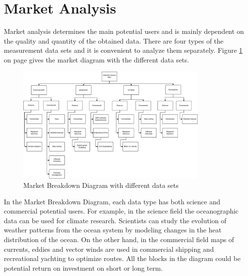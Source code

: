 
\section{Market Analysis}
  \label{blMAanalysis}
Market analysis determines the main potential users and is mainly dependent on the quality and quantity of the obtained data. There are four types of the measurement data sets and it is convenient to analyze them separately. Figure \ref{MA} on page \pageref{MA} gives the market diagram with the different data sets.
\begin{figure} [ht]
	\begin{center}
 \includegraphics[width=0.85\textwidth,angle=0]{chapters/img/Market_analysis.jpg}	
	\caption{Market Breakdown Diagram with different data sets \cite{Market}}
	\label{MA}
	\end{center}
\end{figure}
In the Market Breakdown Diagram, each data type has both science and commercial potential users. For example, in the science field the oceanographic data can be used for climate research. Scientists can study the evolution of weather patterns from the ocean system by modeling changes in the heat distribution of the ocean. On the other hand, in the commercial field maps of currents, eddies and vector winds are used in commercial shipping and recreational yachting to optimize routes. All the blocks in the diagram could be potential return on investment on short or long term.
